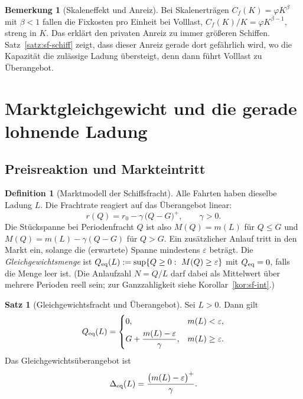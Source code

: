 \documentclass[a4paper, 12pt, twoside, openright]{report}
\providecommand{\pos}[1]{\bigl(#1\bigr)^{+}}   %
\theoremstyle{definition}
\newtheorem{definition}[theorem]{Definition}
\theoremstyle{definition}
\newtheorem{satz}{Satz}[chapter]
\newtheorem{bemerkung}{Bemerkung}[chapter]
\begin{document}
\begin{bemerkung}[Skaleneffekt und Anreiz]
Bei Skalenerträgen $C_f(K)=\varphi K^{\beta}$ mit $\beta<1$ fallen die
Fixkosten pro Einheit bei Volllast, $C_f(K)/K=\varphi K^{\beta-1}$, streng in $K$.
Das erklärt den privaten Anreiz zu immer größeren Schiffen. Satz~\ref{satz:sf-schiff}
zeigt, dass dieser Anreiz gerade dort gefährlich wird, wo die Kapazität die
zulässige Ladung übersteigt, denn dann führt Volllast zu Überangebot.
\end{bemerkung}

\section{Marktgleichgewicht und die gerade lohnende Ladung}\label{sec:sf-gg}

\subsection{Preisreaktion und Markteintritt}

\begin{definition}[Marktmodell der Schiffsfracht]\label{def:sf-markt}
Alle Fahrten haben dieselbe Ladung $L$. Die Frachtrate reagiert auf das
Überangebot linear:
\begin{equation}
  r(Q)=r_0-\gamma\,\pos{Q-G},\qquad\gamma>0.
  \label{eq:sf-preis}
\end{equation}
Die Stückspanne bei Periodenfracht $Q$ ist also
$M(Q)=m(L)$ für $Q\le G$ und $M(Q)=m(L)-\gamma(Q-G)$ für $Q>G$. Ein zusätzlicher
Anlauf tritt in den Markt ein, solange die (erwartete) Spanne mindestens
$\varepsilon$ beträgt. Die \emph{Gleichgewichtsmenge} ist
$Q_{\rm eq}(L):=\sup\{Q\ge0:\ M(Q)\ge\varepsilon\}$ mit $Q_{\rm eq}=0$, falls die
Menge leer ist. (Die Anlaufzahl $N=Q/L$ darf dabei als Mittelwert über mehrere
Perioden reell sein; zur Ganzzahligkeit siehe Korollar~\ref{kor:sf-int}.)
\end{definition}

\begin{satz}[Gleichgewichtsfracht und Überangebot]\label{satz:sf-gg}
Sei $L>0$. Dann gilt
\begin{equation}
  Q_{\rm eq}(L)=\begin{cases}
    0, & m(L)<\varepsilon,\\[3pt]
    G+\dfrac{m(L)-\varepsilon}{\gamma}, & m(L)\ge\varepsilon .
  \end{cases}
  \label{eq:sf-Qeq}
\end{equation}
Das Gleichgewichtsüberangebot ist
\begin{equation}
  \Delta_{\rm eq}(L)=\frac{\pos{m(L)-\varepsilon}}{\gamma}.
  \label{eq:sf-Deq}
\end{equation}
\end{satz}
\end{document}
